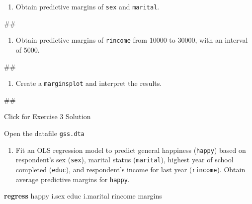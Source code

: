 \documentclass[
]{book}
\newenvironment{Shaded}{\begin{snugshade}}{\end{snugshade}}
\newcommand{\KeywordTok}[1]{\textcolor[rgb]{0.13,0.29,0.53}{\textbf{#1}}}
\newcommand{\NormalTok}[1]{#1}
\providecommand{\tightlist}{%
  \setlength{\itemsep}{0pt}\setlength{\parskip}{0pt}}
\begin{document}
\begin{enumerate}
\def\labelenumi{\arabic{enumi}.}
\setcounter{enumi}{1}
\tightlist
\item
  Obtain predictive margins of \texttt{sex} and \texttt{marital}.
\end{enumerate}

\begin{Shaded}
\begin{Highlighting}[]
\NormalTok{\#\#}
\end{Highlighting}
\end{Shaded}

\begin{enumerate}
\def\labelenumi{\arabic{enumi}.}
\setcounter{enumi}{2}
\tightlist
\item
  Obtain predictive margins of \texttt{rincome} from 10000 to 30000, with an interval of 5000.
\end{enumerate}

\begin{Shaded}
\begin{Highlighting}[]
\NormalTok{\#\#}
\end{Highlighting}
\end{Shaded}

\begin{enumerate}
\def\labelenumi{\arabic{enumi}.}
\setcounter{enumi}{3}
\tightlist
\item
  Create a \texttt{marginsplot} and interpret the results.
\end{enumerate}

\begin{Shaded}
\begin{Highlighting}[]
\NormalTok{\#\# }
\end{Highlighting}
\end{Shaded}

{Click for Exercise 3 Solution}

Open the datafile \texttt{gss.dta}

\begin{enumerate}
\def\labelenumi{\arabic{enumi}.}
\tightlist
\item
  Fit an OLS regression model to predict general happiness (\texttt{happy}) based on respondent's sex (\texttt{sex}), marital status (\texttt{marital}), highest year of school completed (\texttt{educ}), and respondent's income for last year (\texttt{rincome}). Obtain average predictive margins for \texttt{happy}.
\end{enumerate}

\begin{Shaded}
\begin{Highlighting}[]
\KeywordTok{regress}\NormalTok{ happy i.sex educ i.marital rincome}
\NormalTok{margins }
\end{Highlighting}
\end{Shaded}
\end{document}
